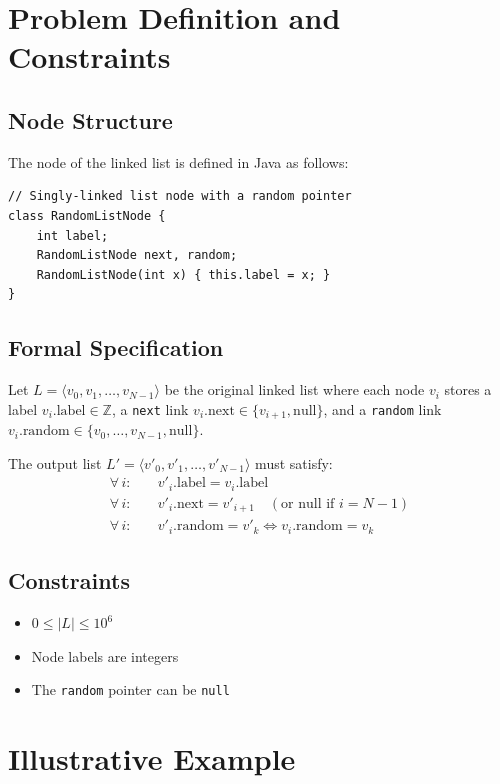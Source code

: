 \documentclass[10pt,journal,compsoc]{IEEEtran}
\begin{document}
\section{Problem Definition and Constraints}
\subsection{Node Structure}

The node of the linked list is defined in Java as follows:

\begin{verbatim}
// Singly-linked list node with a random pointer
class RandomListNode {
    int label;
    RandomListNode next, random;
    RandomListNode(int x) { this.label = x; }
}
\end{verbatim}

\subsection{Formal Specification}

Let $L = \langle v_0, v_1, \ldots, v_{N-1} \rangle$ be the original linked list where each node $v_i$ stores a label $v_i.\text{label} \in \mathbb{Z}$, a \texttt{next} link $v_i.\text{next} \in \{v_{i+1}, \text{null}\}$, and a \texttt{random} link $v_i.\text{random} \in \{v_0, \ldots, v_{N-1}, \text{null}\}$.

The output list $L' = \langle v'_0, v'_1, \ldots, v'_{N-1} \rangle$ must satisfy:
\begin{align}
    \forall\, i : \quad & v'_i.\text{label} = v_i.\text{label} \\
    \forall\, i : \quad & v'_i.\text{next} = v'_{i+1} \quad (\text{or null if } i = N-1) \\
    \forall\, i : \quad & v'_i.\text{random} = v'_k \iff v_i.\text{random} = v_k
\end{align}

\subsection{Constraints}
\begin{itemize}
    \item $0 \leq |L| \leq 10^6$
    \item Node labels are integers
    \item The \texttt{random} pointer can be \texttt{null}
\end{itemize}

\section{Illustrative Example}
\end{document}
